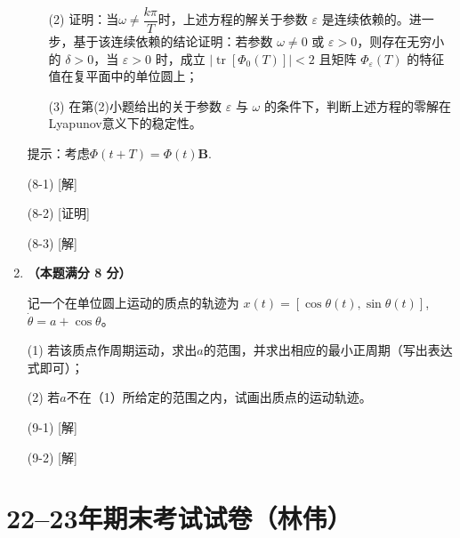 \begin{enumerate}
\begin{enumerate}
    \item[(2)] 证明：当$\omega \not = \dfrac{k\pi}{T}$时，上述方程的解关于参数 $\varepsilon$ 是连续依赖的。进一步，基于该连续依赖的结论证明：若参数 $\omega \neq 0$ 或 $\varepsilon > 0$，则存在无穷小的 $\delta > 0$，当 $\varepsilon > 0$ 时，成立 $|\operatorname{tr}[\Phi_0(T)]| < 2$ 且矩阵 $\Phi_{\varepsilon}(T)$ 的特征值在复平面中的单位圆上；
    
    \item[(3)] 在第(2)小题给出的关于参数 $\varepsilon$ 与 $\omega$ 的条件下，判断上述方程的零解在Lyapunov意义下的稳定性。

\end{enumerate}

提示：考虑$\Phi(t+T)=\Phi(t)\textbf{B}$.

(8-1) [解]

(8-2) [证明]

(8-3) [解]

\item \textbf{（本题满分 8 分）}

    
    记一个在单位圆上运动的质点的轨迹为 $x(t) = [\cos \theta (t), \sin \theta (t)]$, $\dot{\theta} = a+ \cos \theta$。
    
    (1) 若该质点作周期运动，求出$a$的范围，并求出相应的最小正周期（写出表达式即可）；
    
    (2) 若$a$不在（1）所给定的范围之内，试画出质点的运动轨迹。

(9-1) [解]

(9-2) [解]

\end{enumerate}

\section{22--23年期末考试试卷（林伟）}

